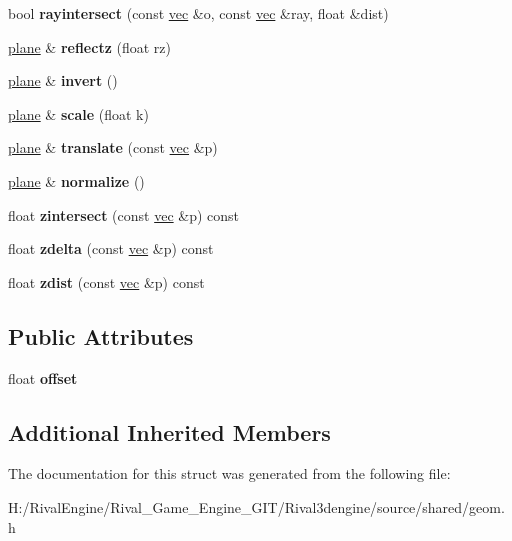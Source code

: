 \begin{DoxyCompactItemize}
bool {\bfseries rayintersect} (const \hyperlink{structvec}{vec} \&o, const \hyperlink{structvec}{vec} \&ray, float \&dist)
\item 
\mbox{\label{structplane_a7aa2cac71754dc2737430c776587032d}} 
\hyperlink{structplane}{plane} \& {\bfseries reflectz} (float rz)
\item 
\mbox{\label{structplane_adf20fe31050529a50ec5f11e9c23a5f3}} 
\hyperlink{structplane}{plane} \& {\bfseries invert} ()
\item 
\mbox{\label{structplane_a19dfc7030ca271621884fdb4e99fab0b}} 
\hyperlink{structplane}{plane} \& {\bfseries scale} (float k)
\item 
\mbox{\label{structplane_a1fb95f5474a931ccdf3161815581fb30}} 
\hyperlink{structplane}{plane} \& {\bfseries translate} (const \hyperlink{structvec}{vec} \&p)
\item 
\mbox{\label{structplane_af2f1296cf9c1f31a4d3db61a114f1232}} 
\hyperlink{structplane}{plane} \& {\bfseries normalize} ()
\item 
\mbox{\label{structplane_a59ec06051b869ccbd4c8f31d9a8348c4}} 
float {\bfseries zintersect} (const \hyperlink{structvec}{vec} \&p) const
\item 
\mbox{\label{structplane_a6cee3946cd90619b58163f05940c929d}} 
float {\bfseries zdelta} (const \hyperlink{structvec}{vec} \&p) const
\item 
\mbox{\label{structplane_a972351cd9246c258d7355827f9ccfe85}} 
float {\bfseries zdist} (const \hyperlink{structvec}{vec} \&p) const
\end{DoxyCompactItemize}
\subsection*{Public Attributes}
\begin{DoxyCompactItemize}
\item 
\mbox{\label{structplane_a6ca659f7c8d2f62114b57bc99bf66639}} 
float {\bfseries offset}
\end{DoxyCompactItemize}
\subsection*{Additional Inherited Members}


The documentation for this struct was generated from the following file\+:\begin{DoxyCompactItemize}
\item 
H\+:/\+Rival\+Engine/\+Rival\+\_\+\+Game\+\_\+\+Engine\+\_\+\+G\+I\+T/\+Rival3dengine/source/shared/geom.\+h\end{DoxyCompactItemize}
